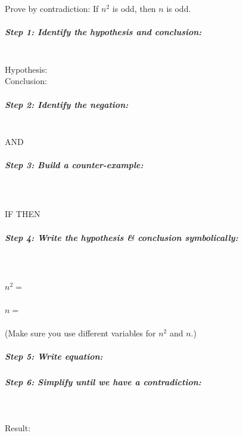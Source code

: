 \documentclass[a4paper,12pt]{book}
\newcounter{question}
\begin{document}
        \newpage
        \begin{questionNOGRADE}{\thequestion}

            Prove by contradiction: If $n^{2}$ is odd, then $n$ is odd.

            \subparagraph{Step 1: Identify the hypothesis and conclusion:}
                ~\\ \tab Hypothesis:    
                ~\\ \tab Conclusion:    
            
            \subparagraph{Step 2: Identify the negation:} ~\\
                
                 AND
            
            \subparagraph{Step 3: Build a counter-example:} ~\\ ~\\
            
                IF 
                 THEN
                
            \subparagraph{Step 4: Write the hypothesis \& conclusion symbolically:}
                
                ~\\~\\ \tab $n^{2} = $ 
                ~\\~\\ \tab $n = $ 
                ~\\~\\ (Make sure you use different variables for $n^{2}$ and $n$.)

            \subparagraph{Step 5: Write equation:}

            \subparagraph{Step 6: Simplify until we have a contradiction:} ~\\

            Result:
            
        \end{questionNOGRADE}
\end{document}
